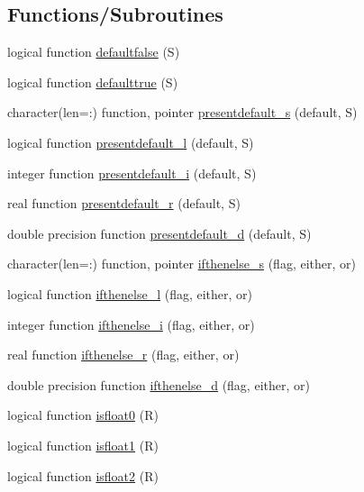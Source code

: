 \subsection*{Functions/\+Subroutines}
\begin{DoxyCompactItemize}
\item 
logical function \mbox{\hyperlink{namespacemiscutils_a9337630be33970a7cde8995bd73c58da}{defaultfalse}} (S)
\item 
logical function \mbox{\hyperlink{namespacemiscutils_a3e4e42b3e3f4fbf064bb2e2b927c5604}{defaulttrue}} (S)
\item 
character(len=\+:) function, pointer \mbox{\hyperlink{namespacemiscutils_aa4029af2cc791ce03e15abe363b19321}{presentdefault\+\_\+s}} (default, S)
\item 
logical function \mbox{\hyperlink{namespacemiscutils_a990745dc5884aa0e44f6025bc182208e}{presentdefault\+\_\+l}} (default, S)
\item 
integer function \mbox{\hyperlink{namespacemiscutils_aed7390d30a673aa276cdcc01a48c217a}{presentdefault\+\_\+i}} (default, S)
\item 
real function \mbox{\hyperlink{namespacemiscutils_a7a5fc2947194e21c6a752c3897bcf7a3}{presentdefault\+\_\+r}} (default, S)
\item 
double precision function \mbox{\hyperlink{namespacemiscutils_a218614e15a9b43ad29ae8c404825916f}{presentdefault\+\_\+d}} (default, S)
\item 
character(len=\+:) function, pointer \mbox{\hyperlink{namespacemiscutils_a994af8094beca0770dd32924d0e7dbdb}{ifthenelse\+\_\+s}} (flag, either, or)
\item 
logical function \mbox{\hyperlink{namespacemiscutils_a87ca2142c2922c2060f891b5bd3da8bb}{ifthenelse\+\_\+l}} (flag, either, or)
\item 
integer function \mbox{\hyperlink{namespacemiscutils_ab0ad194bb45d05df1ffbf495275ff730}{ifthenelse\+\_\+i}} (flag, either, or)
\item 
real function \mbox{\hyperlink{namespacemiscutils_aa5e8165f492c8bced78208b32802202b}{ifthenelse\+\_\+r}} (flag, either, or)
\item 
double precision function \mbox{\hyperlink{namespacemiscutils_ae082d895d28505b733d2171cb6482378}{ifthenelse\+\_\+d}} (flag, either, or)
\item 
logical function \mbox{\hyperlink{namespacemiscutils_a87ddeac831600aa6b24f14468911d710}{isfloat0}} (R)
\item 
logical function \mbox{\hyperlink{namespacemiscutils_af3d292afdf769b0ef58f6cf1f6f0145d}{isfloat1}} (R)
\item 
logical function \mbox{\hyperlink{namespacemiscutils_a64a47fd498b8846f96562efdd041adf4}{isfloat2}} (R)
\end{DoxyCompactItemize}


